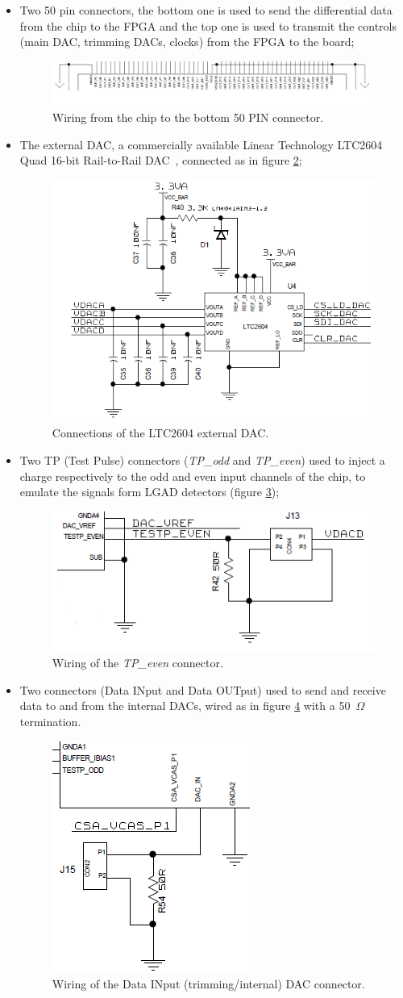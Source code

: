 \begin{itemize}
	\item Two 50 pin connectors, the bottom one is used to send the differential data from the chip to the FPGA and the top one is used to transmit the controls (main DAC, trimming DACs, clocks) from the FPGA to the board;
	\begin{figure}[H]
		\centering
		\includegraphics[width=0.95\linewidth]{IMG/ch5/DATATOFPGA}
		\caption{Wiring from the chip to the bottom 50 PIN connector.}
		\label{fig:datatofpga}
	\end{figure}
	\item The external DAC, a commercially available Linear Technology LTC2604 Quad 16-bit Rail-to-Rail DAC~\cite{LTC2604}, connected as in figure \ref{fig:externaldac};
	\begin{figure}[H]
		\centering
		\includegraphics[width=0.3\linewidth]{IMG/ch5/EXTERNALDAC}
		\caption{Connections of the LTC2604 external DAC.}
		\label{fig:externaldac}
	\end{figure}
	\item Two TP (Test Pulse) connectors (\textit{TP\_odd} and \textit{TP\_even}) used to inject a charge respectively to the odd and even input channels of the chip, to emulate the signals form LGAD detectors (figure \ref{fig:tpconnector});
	\begin{figure}[H]
		\centering
		\includegraphics[width=0.4\linewidth]{IMG/ch5/TPCONNECTOR}
		\caption{Wiring of the \textit{TP\_even} connector.}
		\label{fig:tpconnector}
	\end{figure}
	\item Two connectors (Data INput and Data OUTput) used to send and receive data to and from the internal DACs, wired as in figure \ref{fig:internaldacwiring} with a 50~$\Omega$ termination.
	\begin{figure}[H]
		\centering
		\includegraphics[width=0.2\linewidth]{IMG/ch5/INTERNALDACWIRING}
		\caption{Wiring of the Data INput (trimming/internal) DAC connector.}
		\label{fig:internaldacwiring}
	\end{figure} 
\end{itemize} 
